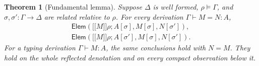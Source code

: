 \documentclass[11pt,a4paper]{article}
\newtheorem{theorem}{Theorem}[section]
\theoremstyle{definition}
\theoremstyle{remark}
\newcommand{\ev}[1]{\mathopen{[\![}#1\mathclose{]\!]}}
\newcommand{\ElemRel}{\mathsf{Elem}}
\begin{document}
\begin{theorem}[Fundamental lemma]\label{thm:fundamental}
Suppose $\Delta$ is well formed, $\rho\models\Gamma$, and
$\sigma,\sigma':\Gamma\to\Delta$ are related relative to $\rho$.
For every derivation $\Gamma\vdash M=N:A$,
\begin{equation}\label{eq:fundamental}
\begin{aligned}
 \ElemRel(\ev M\rho;A[\sigma],M[\sigma],N[\sigma']),\\
 \ElemRel(\ev M\rho;A[\sigma'],M[\sigma],N[\sigma']).
\end{aligned}
\end{equation}
For a typing derivation $\Gamma\vdash M:A$, the same conclusions hold
with $N=M$. They hold on the whole reflected denotation and on every
compact observation below it.
\end{theorem}
\end{document}
